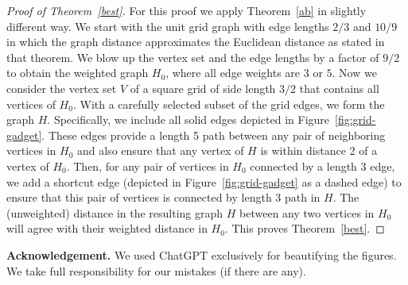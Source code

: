 \documentclass[12pt]{article}
\theoremstyle{plain}
\theoremstyle{definition}
\theoremstyle{remark}
\begin{document}
\begin{proof}[Proof of Theorem~\ref{best}] For this proof we apply Theorem~\ref{ab} in slightly different way. We start with the unit grid graph with edge lengths $2/3$ and $10/9$ in which the graph distance approximates the Euclidean distance as stated in that theorem. We blow up the vertex set and the edge lengths by a factor of $9/2$ to obtain the weighted graph $H_0$, where all edge weights are $3$ or $5$. Now we consider the vertex set $V$ of a square grid of side length $3/2$ that contains all vertices of $H_0$. With a carefully selected subset of the grid edges, we form the graph $H$. Specifically, we include all solid edges depicted in Figure~\ref{fig:grid-gadget}. These edges provide a length 5 path between any pair of neighboring vertices in $H_0$ and also ensure that any vertex of $H$ is within distance 2 of a vertex of $H_0$. Then, for any pair of vertices in $H_0$ connected by a length 3 edge, we add a shortcut edge (depicted in Figure~\ref{fig:grid-gadget} as a dashed edge) to ensure that this pair of vertices is connected by length 3 path in $H$. The (unweighted) distance in the resulting graph $H$ between any two vertices in $H_0$ will agree with their weighted distance in $H_0$. This proves Theorem~\ref{best}.
\end{proof}

\smallskip

\textbf{Acknowledgement.} We used ChatGPT exclusively for beautifying the figures. We take full responsibility for our mistakes (if there are any).
\end{document}
